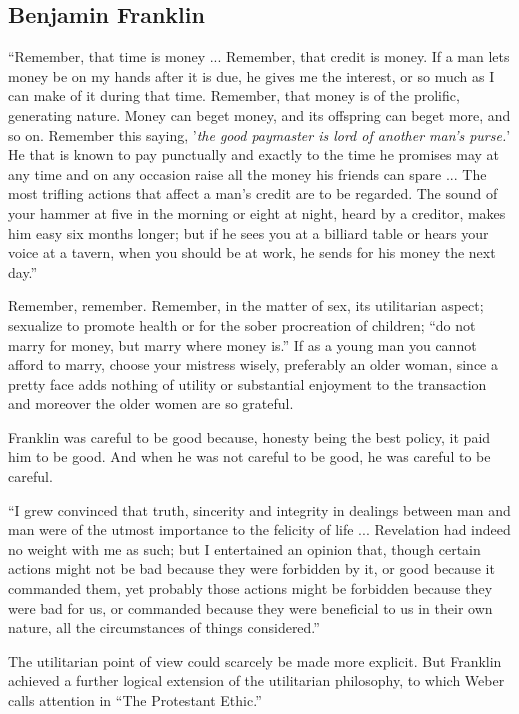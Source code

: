 \documentclass[openany,nobib]{tufte-book}
\begin{document}
\subsection{Benjamin Franklin}

``Remember, that time is money ... Remember, that credit is money. If a
man lets money be on my hands after it is due, he gives me the interest,
or so much as I can make of it during that time. Remember, that money is
of the prolific, generating nature. Money can beget money, and its
offspring can beget more, and so on. Remember this saying, '\emph{the
good paymaster is lord of another man's purse.}' He that is known to pay
punctually and exactly to the time he promises may at any time and on
any occasion raise all the money his friends can spare ... The most
trifling actions that affect a man's credit are to be regarded. The
sound of your hammer at five in the morning or eight at night, heard by
a creditor, makes him easy six months longer; but if he sees you at a
billiard table or hears your voice at a tavern, when you should be at
work, he sends for his money the next day.''

Remember, remember. Remember, in the matter of sex, its utilitarian
aspect; sexualize to promote health or for the sober procreation of
children; ``do not marry for money, but marry where money is.'' If as a
young man you cannot afford to marry, choose your mistress wisely,
preferably an older woman, since a pretty face adds nothing of utility
or substantial enjoyment to the transaction and moreover the older women
are so grateful.

Franklin was careful to be good because, honesty being the best policy,
it paid him to be good. And when he was not careful to be good, he was
careful to be careful.

``I grew convinced that truth, sincerity and integrity in dealings
between man and man were of the utmost importance to the felicity of
life ... Revelation had indeed no weight with me as such; but I
entertained an opinion that, though certain actions might not be bad
because they were forbidden by it, or good because it commanded them,
yet probably those actions might be forbidden because they were bad for
us, or commanded because they were beneficial to us in their own nature,
all the circumstances of things considered.''

The utilitarian point of view could scarcely be made more explicit. But
Franklin achieved a further logical extension of the utilitarian
philosophy, to which Weber calls attention in ``The Protestant Ethic.''
\end{document}
